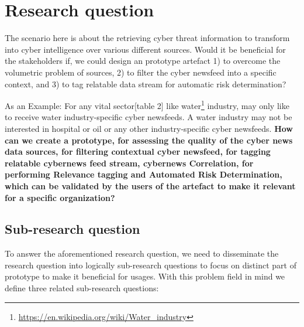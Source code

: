 
\chapter{Research question} %

\label{Chapter5_research-question} %


The scenario here is about the retrieving cyber threat information to transform into cyber intelligence over various different sources. Would it be beneficial for the stakeholders if,  we could design an prototype artefact 1) to overcome the volumetric problem of sources, 2) to filter the cyber newsfeed into a specific context, and 3) to tag relatable data stream for automatic risk determination?

As an Example: For any vital sector\citep{luiijf2003critical}[table 2] like water\footnote{\url{https://en.wikipedia.org/wiki/Water_industry}} industry, may only like to receive water industry-specific cyber newsfeeds. A water industry may not be interested in hospital or oil or any other industry-specific cyber newsfeeds. 
\bigbreak
\textbf{How can we create a prototype, for assessing the quality of the cyber news data sources, for filtering contextual cyber newsfeed, for tagging relatable cybernews feed stream, cybernews Correlation, for performing Relevance tagging and Automated Risk Determination, which can be validated by the users of the artefact to make it relevant for a specific organization?}

\section{Sub-research question}
To answer the aforementioned research question, we need to disseminate the research question into logically  sub-research questions to focus on distinct part of prototype to make it beneficial for usages. With this problem field in mind we define three related sub-research questions:

